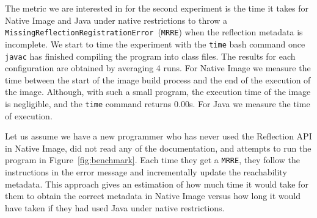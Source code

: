 
The metric we are interested in for the second experiment is the time it takes for Native Image and Java under native restrictions to throw a \verb|MissingReflectionRegistrationError|~(\verb|MRRE|) when the reflection metadata is incomplete.
We start to time the experiment with the \verb|time| bash command once \verb|javac| has finished compiling the program into class files. 
The results for each configuration are obtained by averaging 4 runs.
For Native Image we measure the time between the start of the image build process and the end of the execution of the image. Although, with such a small program, the execution time of the image is negligible, and the \verb|time| command returns 0.00s. For Java we measure the time of execution.

Let us assume we have a new programmer who has never used the Reflection API in Native Image, did not read any of the documentation, and attempts to run the program in Figure~\ref{fig:benchmark}. Each time they get a \verb|MRRE|, they follow the instructions in the error message and incrementally update the reachability metadata.
This approach gives an estimation of how much time it would take for them to obtain the correct metadata in Native Image versus how long it would have taken if they had used Java under native restrictions. 

